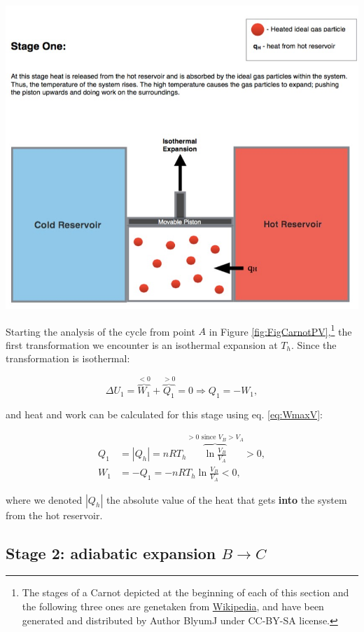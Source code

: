 \documentclass[
  9pt,
]{extbook}
\theoremstyle{definition}
\theoremstyle{definition}
\theoremstyle{definition}
\theoremstyle{definition}
\theoremstyle{remark}
\begin{document}
\begin{center}\includegraphics[width=0.7\linewidth]{./img/OEP_Figures.007a} \end{center}

Starting the analysis of the cycle from point \(A\) in Figure \ref{fig:FigCarnotPV},\footnote{The stages of a Carnot depicted at the beginning of each of this section and the following three ones are genetaken from \href{https://en.wikipedia.org/wiki/Carnot_cycle}{Wikipedia}, and have been generated and distributed by Author BlyumJ under CC-BY-SA license.} the first transformation we encounter is an isothermal expansion at \(T_h\). Since the transformation is isothermal:

\begin{equation}
\Delta U_1 = \overbrace{W_1}^{<0} + \overbrace{Q_1}^{>0} = 0 \Rightarrow Q_1 = -W_1,
  \label{eq:CCst1}
\end{equation}

and heat and work can be calculated for this stage using eq. \eqref{eq:WmaxV}:

\begin{equation}
\begin{aligned}
 Q_1 & = \left| Q_h \right|  = nRT_h \overbrace{\ln \frac{V_B}{V_A}}^{>0 \text{ since } V_B>V_A} > 0, \\
 W_1 & = -Q_1 = - nRT_h \ln \frac{V_B}{V_A} < 0,
\end{aligned}
  \label{eq:CCst1b}
\end{equation}

where we denoted \(\left| Q_h \right|\) the absolute value of the heat that gets \textbf{into} the system from the hot reservoir.

\subsection{\texorpdfstring{Stage 2: adiabatic expansion \(B \rightarrow C\)}{Stage 2: adiabatic expansion B \textbackslash rightarrow C}}\label{CCstage2}
\end{document}
